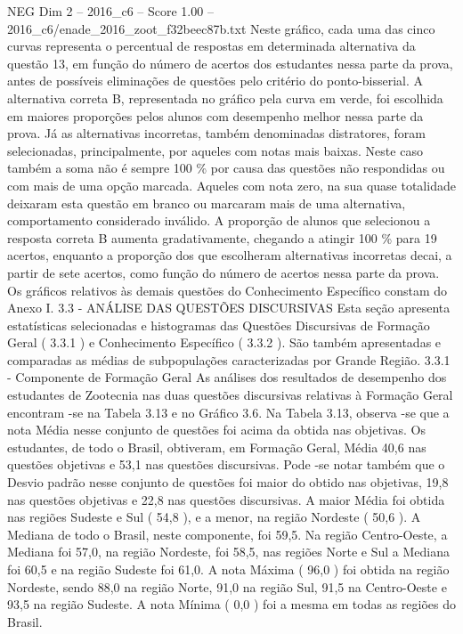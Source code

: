 \begin{textsample}{NEG Dim 2 – 2016\_c6 – Score 1.00 – 2016\_c6/enade\_2016\_zoot\_f32beec87b.txt}
Neste gráfico, cada uma das cinco curvas representa o percentual de respostas em determinada alternativa da questão 13, em função do número de acertos dos estudantes nessa parte da prova, antes de possíveis eliminações de questões pelo critério do ponto-bisserial.
A alternativa correta B, representada no gráfico pela curva em verde, foi escolhida em maiores proporções pelos alunos com desempenho melhor nessa parte da prova.
Já as alternativas incorretas, também denominadas distratores, foram selecionadas, principalmente, por aqueles com notas mais baixas.
Neste caso também a soma não é sempre 100 \% por causa das questões não respondidas ou com mais de uma opção marcada.
Aqueles com nota zero, na sua quase totalidade deixaram esta questão em branco ou marcaram mais de uma alternativa, comportamento considerado inválido.
A proporção de alunos que selecionou a resposta correta B aumenta gradativamente, chegando a atingir 100 \% para 19 acertos, enquanto a proporção dos que escolheram alternativas incorretas decai, a partir de sete acertos, como função do número de acertos nessa parte da prova.
Os gráficos relativos às demais questões do Conhecimento Específico constam do Anexo I. 3.3 - ANÁLISE DAS QUESTÕES DISCURSIVAS Esta seção apresenta estatísticas selecionadas e histogramas das Questões Discursivas de Formação Geral ( 3.3.1 ) e Conhecimento Específico ( 3.3.2 ).
São também apresentadas e comparadas as médias de subpopulações caracterizadas por Grande Região. 3.3.1 - Componente de Formação Geral As análises dos resultados de desempenho dos estudantes de Zootecnia nas duas questões discursivas relativas à Formação Geral encontram -se na Tabela 3.13 e no Gráfico 3.6.
Na Tabela 3.13, observa -se que a nota Média nesse conjunto de questões foi acima da obtida nas objetivas.
Os estudantes, de todo o Brasil, obtiveram, em Formação Geral, Média 40,6 nas questões objetivas e 53,1 nas questões discursivas.
Pode -se notar também que o Desvio padrão nesse conjunto de questões foi maior do obtido nas objetivas, 19,8 nas questões objetivas e 22,8 nas questões discursivas.
A maior Média foi obtida nas regiões Sudeste e Sul ( 54,8 ), e a menor, na região Nordeste ( 50,6 ).
A Mediana de todo o Brasil, neste componente, foi 59,5.
Na região Centro-Oeste, a Mediana foi 57,0, na região Nordeste, foi 58,5, nas regiões Norte e Sul a Mediana foi 60,5 e na região Sudeste foi 61,0.
A nota Máxima ( 96,0 ) foi obtida na região Nordeste, sendo 88,0 na região Norte, 91,0 na região Sul, 91,5 na Centro-Oeste e 93,5 na região Sudeste.
A nota Mínima ( 0,0 ) foi a mesma em todas as regiões do Brasil.

\end{textsample}
